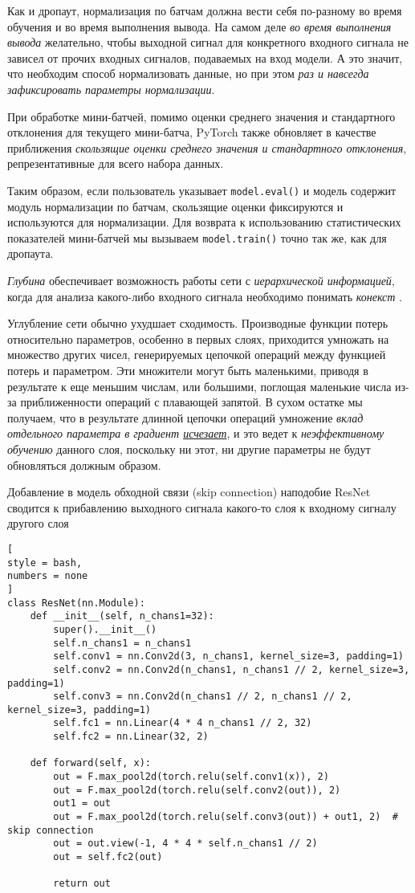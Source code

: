 \documentclass[%
	11pt,
	a4paper,
	utf8,
		]{article}
\begin{document}
Как и дропаут, нормализация по батчам должна вести себя по-разному во время обучения и во время выполнения вывода. На самом деле \emph{во время выполнения вывода} желательно, чтобы выходной сигнал для конкретного входного сигнала не зависел от прочих входных сигналов, подаваемых на вход модели. А это значит, что необходим способ нормализовать данные, но при этом \emph{раз и навсегда зафиксировать параметры нормализации}.

При обработке мини-батчей, помимо оценки среднего значения и стандартного отклонения для текущего мини-батча, PyTorch также обновляет в качестве приближения \emph{скользящие оценки среднего значения и стандартного отклонения}, репрезентативные для всего набора данных.

Таким образом, если пользователь указывает \verb|model.eval()| и модель содержит модуль нормализации по батчам, скользящие оценки фиксируются и используются для нормализации. Для возврата к использованию статистических показателей мини-батчей мы вызываем \verb|model.train()| точно так же, как для дропаута.

\emph{Глубина} обеспечивает возможность работы сети с \emph{иерархической информацией}, когда для анализа какого-либо входного сигнала необходимо понимать \emph{конекст} \cite[]{pytorch-2022}.

Углубление сети обычно ухудшает сходимость. Производные функции потерь относительно параметров, особенно в первых слоях, приходится умножать на множество других чисел, генерируемых цепочкой операций между функцией потерь и параметром. Эти множители могут быть маленькими, приводя в результате к еще меньшим числам, или большими, поглощая маленькие числа из-за приближенности операций с плавающей запятой. В сухом остатке мы получаем, что в результате длинной цепочки операций умножение \emph{вклад отдельного параметра в градиент \underline{исчезает}}, и это ведет к \emph{неэффективному обучению} данного слоя, поскольку ни этот, ни другие параметры не будут обновляться должным образом.

Добавление в модель обходной связи (skip connection) наподобие ResNet сводится к прибавлению выходного сигнала какого-то слоя к входному сигналу другого слоя
\begin{lstlisting}[
style = bash,
numbers = none
]
class ResNet(nn.Module):
    def __init__(self, n_chans1=32):
        super().__init__()
        self.n_chans1 = n_chans1
        self.conv1 = nn.Conv2d(3, n_chans1, kernel_size=3, padding=1)
        self.conv2 = nn.Conv2d(n_chans1, n_chans1 // 2, kernel_size=3, padding=1)
        self.conv3 = nn.Conv2d(n_chans1 // 2, n_chans1 // 2, kernel_size=3, padding=1)
        self.fc1 = nn.Linear(4 * 4 n_chans1 // 2, 32)
        self.fc2 = nn.Linear(32, 2)
        
    def forward(self, x):
        out = F.max_pool2d(torch.relu(self.conv1(x)), 2)
        out = F.max_pool2d(torch.relu(self.conv2(out)), 2)
        out1 = out
        out = F.max_pool2d(torch.relu(self.conv3(out)) + out1, 2)  # skip connection
        out = out.view(-1, 4 * 4 * self.n_chans1 // 2)
        out = self.fc2(out)
        
        return out
\end{lstlisting}
\end{document}

